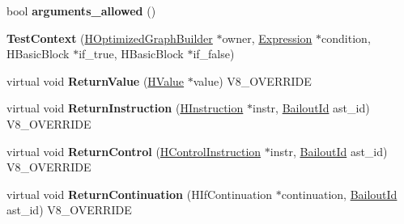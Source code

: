 \begin{DoxyCompactItemize}
\item 
\hypertarget{classv8_1_1internal_1_1_v8___f_i_n_a_l_a7530dd261efd31f5d3484339a8f2dd10}{}bool {\bfseries arguments\+\_\+allowed} ()\label{classv8_1_1internal_1_1_v8___f_i_n_a_l_a7530dd261efd31f5d3484339a8f2dd10}

\item 
\hypertarget{classv8_1_1internal_1_1_v8___f_i_n_a_l_a2cc2ef7b23e6b7bb1c6b8990686ac2a0}{}{\bfseries Test\+Context} (\hyperlink{classv8_1_1internal_1_1_h_optimized_graph_builder}{H\+Optimized\+Graph\+Builder} $\ast$owner, \hyperlink{classv8_1_1internal_1_1_expression}{Expression} $\ast$condition, H\+Basic\+Block $\ast$if\+\_\+true, H\+Basic\+Block $\ast$if\+\_\+false)\label{classv8_1_1internal_1_1_v8___f_i_n_a_l_a2cc2ef7b23e6b7bb1c6b8990686ac2a0}

\item 
\hypertarget{classv8_1_1internal_1_1_v8___f_i_n_a_l_a786f6c33e41273e0430caf595a86029b}{}virtual void {\bfseries Return\+Value} (\hyperlink{classv8_1_1internal_1_1_h_value}{H\+Value} $\ast$value) V8\+\_\+\+O\+V\+E\+R\+R\+I\+D\+E\label{classv8_1_1internal_1_1_v8___f_i_n_a_l_a786f6c33e41273e0430caf595a86029b}

\item 
\hypertarget{classv8_1_1internal_1_1_v8___f_i_n_a_l_adde278b58415cb2d35bacc91538f0894}{}virtual void {\bfseries Return\+Instruction} (\hyperlink{classv8_1_1internal_1_1_h_instruction}{H\+Instruction} $\ast$instr, \hyperlink{classv8_1_1internal_1_1_bailout_id}{Bailout\+Id} ast\+\_\+id) V8\+\_\+\+O\+V\+E\+R\+R\+I\+D\+E\label{classv8_1_1internal_1_1_v8___f_i_n_a_l_adde278b58415cb2d35bacc91538f0894}

\item 
\hypertarget{classv8_1_1internal_1_1_v8___f_i_n_a_l_a87e4ffd42f8a26a5da6cc93125d6a804}{}virtual void {\bfseries Return\+Control} (\hyperlink{classv8_1_1internal_1_1_h_control_instruction}{H\+Control\+Instruction} $\ast$instr, \hyperlink{classv8_1_1internal_1_1_bailout_id}{Bailout\+Id} ast\+\_\+id) V8\+\_\+\+O\+V\+E\+R\+R\+I\+D\+E\label{classv8_1_1internal_1_1_v8___f_i_n_a_l_a87e4ffd42f8a26a5da6cc93125d6a804}

\item 
\hypertarget{classv8_1_1internal_1_1_v8___f_i_n_a_l_a3c3742dc48b0f93f5dc4236db07168be}{}virtual void {\bfseries Return\+Continuation} (H\+If\+Continuation $\ast$continuation, \hyperlink{classv8_1_1internal_1_1_bailout_id}{Bailout\+Id} ast\+\_\+id) V8\+\_\+\+O\+V\+E\+R\+R\+I\+D\+E\label{classv8_1_1internal_1_1_v8___f_i_n_a_l_a3c3742dc48b0f93f5dc4236db07168be}


\end{DoxyCompactItemize}

